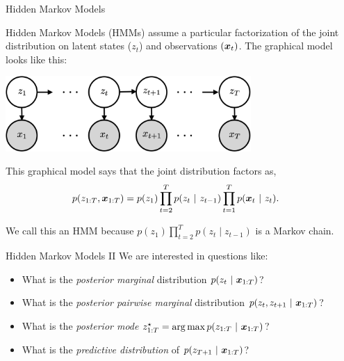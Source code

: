 \documentclass[aspectratio=169]{beamer}
\begin{document}
\begin{frame}{Hidden Markov Models}

Hidden Markov Models (HMMs) assume a particular factorization of the joint distribution on latent states ($z_t$) and observations $(\boldsymbol{x}_t)$. The graphical model looks like this:

\begin{center}
    \includegraphics[width=0.7\textwidth]{figures/lap7/hmm.png}    
\end{center}

This graphical model says that the joint distribution factors as,
\begin{align}
    p(z_{1:T}, \boldsymbol{x}_{1:T}) &= p(z_1) \prod_{t=2}^T p(z_t ~\vert~ z_{t-1}) \prod_{t=1}^T p(\boldsymbol{x}_t ~\vert~ z_t).
\end{align}

We call this an HMM because $p(z_1) \prod_{t=2}^T p(z_t \mid z_{t-1})$ is a Markov chain.
    
\end{frame}

\begin{frame}{Hidden Markov Models II}
We are interested in questions like:
\begin{itemize}
    \item What is the \textit{posterior marginal} distribution $p(z_t ~\vert~ \boldsymbol{x}_{1:T})$?
    \item What is the \textit{posterior pairwise marginal} distribution $p(z_t, z_{t+1} ~\vert~ \boldsymbol{x}_{1:T})$?
    \item What is the \textit{posterior mode} $z_{1:T}^\star = \operatorname*{arg\,max} p(z_{1:T} ~\vert~ \boldsymbol{x}_{1:T})$?
    \item What is the \textit{predictive distribution} of $p(z_{T+1} ~\vert~ \boldsymbol{x}_{1:T})$?
\end{itemize}

\end{frame}
\end{document}
